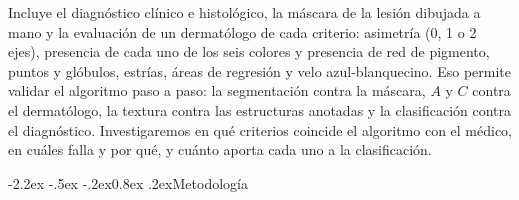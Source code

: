 \documentclass[11pt,a4paper]{article}
\makeatletter
\renewcommand\subsection{\@startsection{subsection}{2}{\z@}%
  {-2.2ex \@plus -.5ex \@minus -.2ex}{0.8ex \@plus .2ex}{\normalfont\normalsize\bfseries}}
\makeatother
\begin{document}
Incluye el diagnóstico clínico e histológico, la máscara de la lesión
dibujada a mano y la evaluación de un dermatólogo de cada criterio:
asimetría (0, 1 o 2 ejes), presencia de cada uno de los seis colores y
presencia de red de pigmento, puntos y glóbulos, estrías, áreas de
regresión y velo azul-blanquecino. Eso permite validar el algoritmo paso
a paso: la segmentación contra la máscara, $A$ y $C$ contra el
dermatólogo, la textura contra las estructuras anotadas y la
clasificación contra el diagnóstico. Investigaremos en qué criterios
coincide el algoritmo con el médico, en cuáles falla y por qué, y cuánto
aporta cada uno a la clasificación.

\subsection{Metodología}
\end{document}
